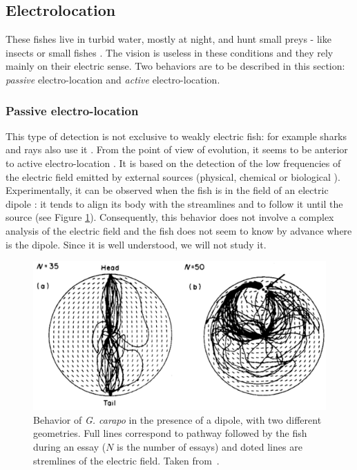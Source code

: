 \subsection{Electrolocation}

\label{sub:electro-localisation}

These fishes live in turbid water, mostly at night, and hunt small
preys - like insects or small fishes \cite{albert2005diversity,okedi1971food}.
The vision is useless in these conditions and they rely mainly on
their electric sense. Two behaviors are to be described in this section:
\emph{passive }electro-location and \emph{active }electro-location.


\subsubsection{Passive electro-location}

This type of detection is not exclusive to weakly electric fish: for
example sharks and rays also use it \cite{adair1998detection,kalmijn-1988}.
From the point of view of evolution, it seems to be anterior to active
electro-location \cite{lissmann1958evolution}. It is based on the
detection of the low frequencies of the electric field emitted by
external sources (physical, chemical or biological \cite{kalmijn-1988}).
Experimentally, it can be observed when the fish is in the field of
an electric dipole \cite{hopkins-passive}: it tends to align its
body with the streamlines and to follow it until the source (see Figure
\ref{fig:behavior_passive_electro-location}). Consequently, this
behavior does not involve a complex analysis of the electric field
and the fish does not seem to know by advance where is the dipole.
Since it is well understood, we will not study it.

\begin{figure}[h]
\centering
\includegraphics[width=12cm]{intro/figures/passive_electrolocation}
\caption{Behavior of \emph{G. carapo} in the presence of a dipole, with two
different geometries. Full lines correspond to pathway followed by
the fish during an essay ($N$ is the number of essays) and doted
lines are stremlines of the electric field. Taken from~\cite{davis1988behavioural}.\label{fig:behavior_passive_electro-location}}
\end{figure}



